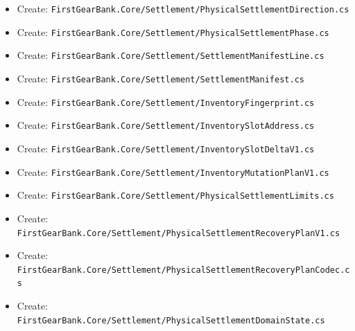 \documentclass[
  10pt,
  letterpaper,
]{article}
\providecommand{\tightlist}{%
  \setlength{\itemsep}{0pt}\setlength{\parskip}{0pt}}
\begin{document}
\begin{itemize}
\tightlist
\item
  Create:
  \texttt{FirstGearBank.}\allowbreak{}\texttt{Core/}\allowbreak{}\texttt{Settlement/}\allowbreak{}\texttt{PhysicalSettlementDirection.}\allowbreak{}\texttt{cs}
\item
  Create:
  \texttt{FirstGearBank.}\allowbreak{}\texttt{Core/}\allowbreak{}\texttt{Settlement/}\allowbreak{}\texttt{PhysicalSettlementPhase.}\allowbreak{}\texttt{cs}
\item
  Create:
  \texttt{FirstGearBank.}\allowbreak{}\texttt{Core/}\allowbreak{}\texttt{Settlement/}\allowbreak{}\texttt{SettlementManifestLine.}\allowbreak{}\texttt{cs}
\item
  Create:
  \texttt{FirstGearBank.}\allowbreak{}\texttt{Core/}\allowbreak{}\texttt{Settlement/}\allowbreak{}\texttt{SettlementManifest.}\allowbreak{}\texttt{cs}
\item
  Create:
  \texttt{FirstGearBank.}\allowbreak{}\texttt{Core/}\allowbreak{}\texttt{Settlement/}\allowbreak{}\texttt{InventoryFingerprint.}\allowbreak{}\texttt{cs}
\item
  Create:
  \texttt{FirstGearBank.}\allowbreak{}\texttt{Core/}\allowbreak{}\texttt{Settlement/}\allowbreak{}\texttt{InventorySlotAddress.}\allowbreak{}\texttt{cs}
\item
  Create:
  \texttt{FirstGearBank.}\allowbreak{}\texttt{Core/}\allowbreak{}\texttt{Settlement/}\allowbreak{}\texttt{InventorySlotDeltaV1.}\allowbreak{}\texttt{cs}
\item
  Create:
  \texttt{FirstGearBank.}\allowbreak{}\texttt{Core/}\allowbreak{}\texttt{Settlement/}\allowbreak{}\texttt{InventoryMutationPlanV1.}\allowbreak{}\texttt{cs}
\item
  Create:
  \texttt{FirstGearBank.}\allowbreak{}\texttt{Core/}\allowbreak{}\texttt{Settlement/}\allowbreak{}\texttt{PhysicalSettlementLimits.}\allowbreak{}\texttt{cs}
\item
  Create:
  \texttt{FirstGearBank.}\allowbreak{}\texttt{Core/}\allowbreak{}\texttt{Settlement/}\allowbreak{}\texttt{PhysicalSettlementRecoveryPlanV1.}\allowbreak{}\texttt{cs}
\item
  Create:
  \texttt{FirstGearBank.}\allowbreak{}\texttt{Core/}\allowbreak{}\texttt{Settlement/}\allowbreak{}\texttt{PhysicalSettlementRecoveryPlanCodec.}\allowbreak{}\texttt{cs}
\item
  Create:
  \texttt{FirstGearBank.}\allowbreak{}\texttt{Core/}\allowbreak{}\texttt{Settlement/}\allowbreak{}\texttt{PhysicalSettlementDomainState.}\allowbreak{}\texttt{cs}

\end{itemize}
\end{document}
